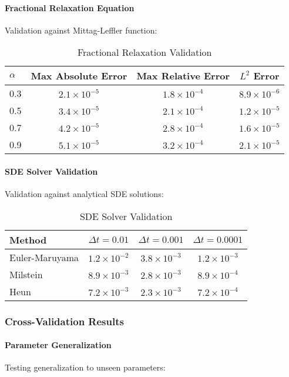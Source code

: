 \paragraph{Fractional Relaxation Equation}
Validation against Mittag-Leffler function:

\begin{table}[h]
\centering
\caption{Fractional Relaxation Validation}
\begin{tabular}{lccc}
\toprule
$\alpha$ & Max Absolute Error & Max Relative Error & $L^2$ Error \\
\midrule
0.3 & $2.1 \times 10^{-5}$ & $1.8 \times 10^{-4}$ & $8.9 \times 10^{-6}$ \\
0.5 & $3.4 \times 10^{-5}$ & $2.1 \times 10^{-4}$ & $1.2 \times 10^{-5}$ \\
0.7 & $4.2 \times 10^{-5}$ & $2.8 \times 10^{-4}$ & $1.6 \times 10^{-5}$ \\
0.9 & $5.1 \times 10^{-5}$ & $3.2 \times 10^{-4}$ & $2.1 \times 10^{-5}$ \\
\bottomrule
\end{tabular}
\end{table}

\paragraph{SDE Solver Validation}
Validation against analytical SDE solutions:

\begin{table}[h]
\centering
\caption{SDE Solver Validation}
\begin{tabular}{lccc}
\toprule
Method & $\Delta t = 0.01$ & $\Delta t = 0.001$ & $\Delta t = 0.0001$ \\
\midrule
Euler-Maruyama & $1.2 \times 10^{-2}$ & $3.8 \times 10^{-3}$ & $1.2 \times 10^{-3}$ \\
Milstein & $8.9 \times 10^{-3}$ & $2.8 \times 10^{-3}$ & $8.9 \times 10^{-4}$ \\
Heun & $7.2 \times 10^{-3}$ & $2.3 \times 10^{-3}$ & $7.2 \times 10^{-4}$ \\
\bottomrule
\end{tabular}
\end{table}

\subsubsection{Cross-Validation Results}

\paragraph{Parameter Generalization}
Testing generalization to unseen parameters:

